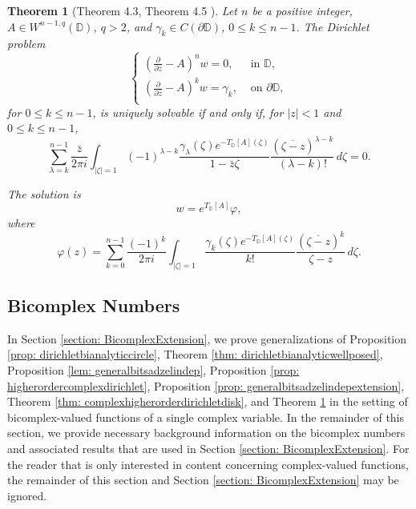 \documentclass[12pt,reqno]{amsart}
\newtheorem{theorem}{Theorem}[section]
\theoremstyle{definition}
\theoremstyle{remark}
\newcommand{\p}{\partial}
\newcommand{\z}{\bar z}
\newcommand{\disk}{\mathbb{D}}
\begin{document}
        \begin{theorem}[Theorem 4.3, Theorem 4.5 \cite{WBD2}]\label{thm: thmfourpointfivewbd2}
            Let $n$ be a positive integer, $A \in W^{n-1,q}(\disk)$, $q>2$, and $\gamma_k \in C(\p\disk)$, $0 \leq k \leq n-1$. The Dirichlet problem
            \[
                \begin{cases}
                    \left( \frac{\p}{\p\z}-A \right)^n w = 0, & \text{ in } \disk,\\
                    \left( \frac{\p}{\p\z}-A \right)^k w = \gamma_k, & \text{ on } \p\disk,\\
                \end{cases}
            \]
            for $0 \leq k \leq n-1$, is uniquely solvable if and only if, for $|z| < 1$  and $0 \leq k \leq n-1$,
            \[
                \sum_{\lambda = k}^{n-1}\frac{\z}{2\pi i} \int_{|\zeta| = 1} (-1)^{\lambda - k} \frac{\gamma_\lambda(\zeta)e^{-T_\disk[A](\zeta)}}{1- \z\zeta} \frac{(\overline{\zeta - z})^{\lambda- k}}{(\lambda - k)!}\,d\zeta   = 0.
            \]

            The solution is 
            \[
                w = e^{T_\disk[A]}  \varphi, 
            \]
            where
            \[
                \varphi(z) =  \sum_{k=0}^{n-1} \frac{(-1)^k}{2\pi i} \int_{|\zeta| = 1} \frac{\gamma_k(\zeta)e^{-T_\disk[A](\zeta)}}{k!} \frac{(\overline{\zeta - z})^k}{\zeta - z}\,d\zeta .
            \]
            
         \end{theorem}   
            

    \subsection{Bicomplex Numbers}

        In Section \ref{section: BicomplexExtension}, we prove generalizations of Proposition \ref{prop: dirichletbianalyticcircle}, Theorem \ref{thm: dirichletbianalyticwellposed}, Proposition \ref{lem: generalbitsadzelindep}, Proposition \ref{prop: higherordercomplexdirichlet}, Proposition \ref{prop: generalbitsadzelindepextension}, Theorem \ref{thm: complexhigherorderdirichletdisk}, and Theorem \ref{thm: thmfourpointfivewbd2} in the setting of bicomplex-valued functions of a single complex variable. In the remainder of this section, we provide necessary background information on the bicomplex numbers and associated results that are used in Section \ref{section: BicomplexExtension}. For the reader that is only interested in content concerning complex-valued functions, the remainder of this section and Section \ref{section: BicomplexExtension} may be ignored.
\end{document}
